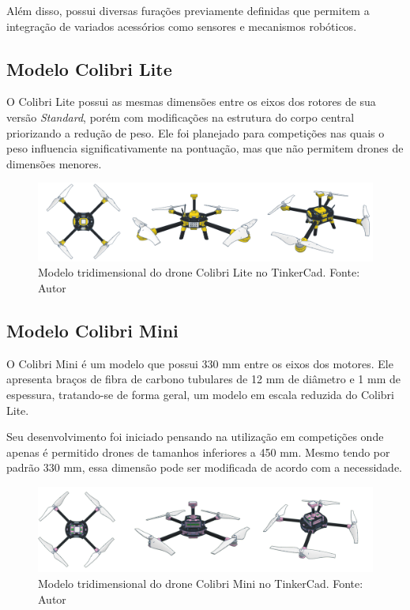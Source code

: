 \documentclass[conference]{IEEEtran}
\begin{document}
Além disso, possui diversas furações previamente definidas que permitem a integração de variados acessórios como sensores e mecanismos robóticos.

\subsection{Modelo Colibri Lite}

O Colibri Lite possui as mesmas dimensões entre os eixos dos rotores de sua versão \textit{Standard}, porém com modificações na estrutura do corpo central priorizando a redução de peso. Ele foi planejado para competições nas quais o peso influencia significativamente na pontuação, mas que não permitem drones de dimensões menores.

\begin{figure}[!htb]
    \centering
    \includegraphics[scale=0.14]{img/Colibri-lite.png} 
    \caption{Modelo tridimensional do drone Colibri Lite no TinkerCad. Fonte: Autor}
    \label{fig:my_label}
\end{figure}

\subsection{Modelo Colibri Mini}
O Colibri Mini é um modelo que possui 330 mm entre os eixos dos motores. Ele apresenta braços de fibra de carbono tubulares de 12 mm de diâmetro e 1 mm de espessura, tratando-se de forma geral, um modelo em escala reduzida do Colibri Lite. 

Seu desenvolvimento foi iniciado pensando na utilização em competições onde apenas é permitido drones de tamanhos inferiores a 450 mm. Mesmo tendo por padrão 330 mm, essa dimensão pode ser modificada de acordo com a necessidade.

\begin{figure}[!htb]
    \centering
    \includegraphics[scale=0.14]{img/Colibri-mini.png} 
    \caption{Modelo tridimensional do drone Colibri Mini no TinkerCad. Fonte: Autor}
    \label{fig:ColibriMini}
\end{figure}
\end{document}
